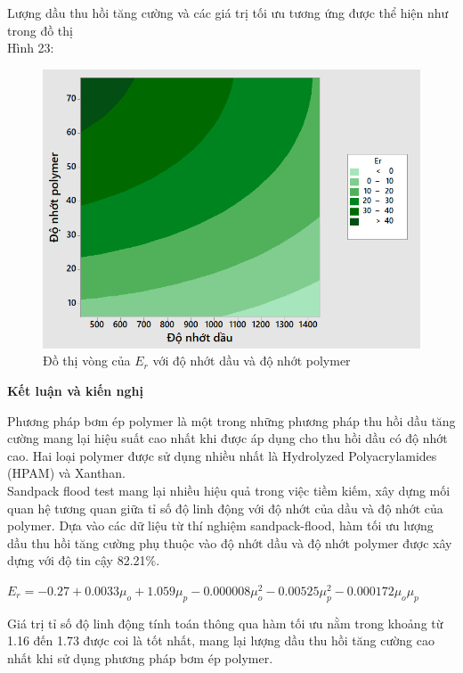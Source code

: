 \documentclass[12pt,a4paper]{article}
\begin{document}
	\noindent
	Lượng dầu thu hồi tăng cường và các giá trị tối ưu tương ứng được thể hiện như trong đồ thị\\ Hình 23:
	\begin{figure}[h]
		\centering
		\includegraphics[scale=.8]{Fig/ContourEr.PNG}
		\caption{Đồ thị vòng của $E_r$ với độ nhớt dầu và độ nhớt polymer}
	\end{figure}
\clearpage
\noindent
\textbf{\LARGE Kết luận và kiến nghị}\\[-0.3cm]
\newline
	Phương pháp bơm ép polymer là một trong những phương pháp thu hồi dầu tăng cường mang lại hiệu suất cao nhất khi được áp dụng cho thu hồi dầu có độ nhớt cao. Hai loại polymer được sử dụng nhiều nhất là Hydrolyzed Polyacrylamides (HPAM) và Xanthan.\\
	Sandpack flood test mang lại nhiều hiệu quả trong việc tiềm kiếm, xây dựng mối quan hệ tương quan giữa tỉ số độ linh động với độ nhớt của dầu và độ nhớt của polymer. Dựa vào các dữ liệu từ thí nghiệm sandpack-flood, hàm tối ưu lượng dầu thu hồi tăng cường phụ thuộc vào độ nhớt dầu và độ nhớt polymer được xây dựng với độ tin cậy 82.21\%.
	\begin{center}
	\centering
		$E_r=-0.27+0.0033\mu_o+1.059\mu_p-0.000008\mu_o^2-0.00525\mu_p^2-0.000172\mu_o\mu_p$
	\end{center}
	Giá trị tỉ số độ linh động tính toán thông qua hàm tối ưu nằm trong khoảng từ 1.16 đến 1.73 được coi là tốt nhất, mang lại lượng dầu thu hồi tăng cường cao nhất khi sử dụng phương pháp bơm ép polymer.\\
\end{document}
